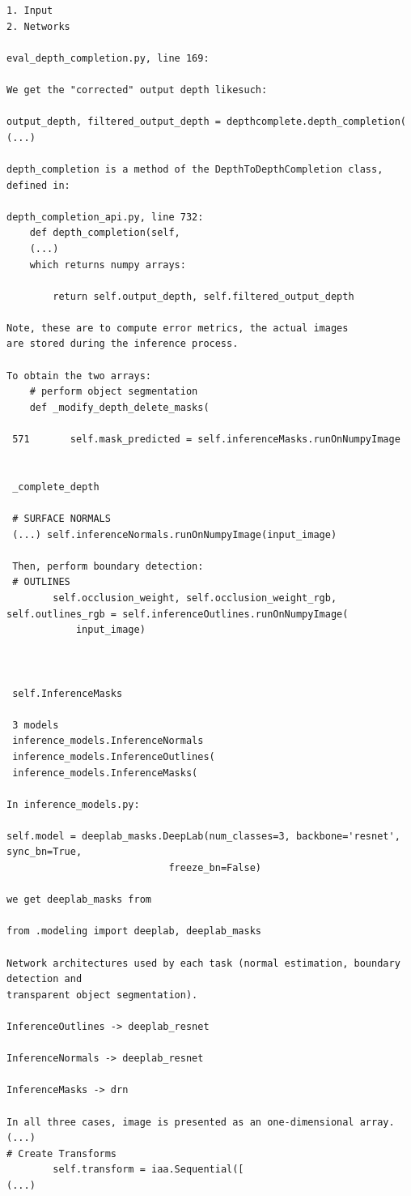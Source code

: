 \begin{verbatim}
1. Input
2. Networks

eval_depth_completion.py, line 169:

We get the "corrected" output depth likesuch:

output_depth, filtered_output_depth = depthcomplete.depth_completion(
(...)

depth_completion is a method of the DepthToDepthCompletion class,
defined in:

depth_completion_api.py, line 732:
    def depth_completion(self,
    (...)
    which returns numpy arrays:
    
        return self.output_depth, self.filtered_output_depth

Note, these are to compute error metrics, the actual images
are stored during the inference process.

To obtain the two arrays:    
    # perform object segmentation
    def _modify_depth_delete_masks(

 571       self.mask_predicted = self.inferenceMasks.runOnNumpyImage
 
 
 _complete_depth
 
 # SURFACE NORMALS
 (...) self.inferenceNormals.runOnNumpyImage(input_image)
 
 Then, perform boundary detection:
 # OUTLINES
        self.occlusion_weight, self.occlusion_weight_rgb, self.outlines_rgb = self.inferenceOutlines.runOnNumpyImage(
            input_image)
            
            
 
 self.InferenceMasks
 
 3 models
 inference_models.InferenceNormals
 inference_models.InferenceOutlines(
 inference_models.InferenceMasks(
 
In inference_models.py:
 
self.model = deeplab_masks.DeepLab(num_classes=3, backbone='resnet', sync_bn=True,
                            freeze_bn=False)
                            
we get deeplab_masks from

from .modeling import deeplab, deeplab_masks

Network architectures used by each task (normal estimation, boundary detection and 
transparent object segmentation).

InferenceOutlines -> deeplab_resnet

InferenceNormals -> deeplab_resnet

InferenceMasks -> drn

In all three cases, image is presented as an one-dimensional array.
(...)
# Create Transforms
        self.transform = iaa.Sequential([
(...)


\end{verbatim}

